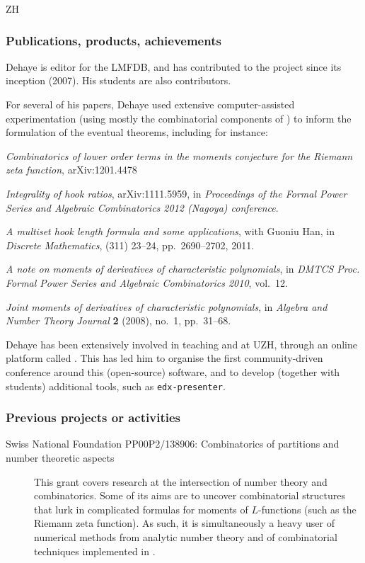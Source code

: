 \begin{sitedescription}{ZH}
\subsubsection*{Publications, products, achievements}
\begin{compactenum}
\item Dehaye is editor for the LMFDB, and has contributed to the project since its inception (2007). His students are also contributors. 
\item For several of his papers, Dehaye used extensive computer-assisted experimentation (using mostly the combinatorial components of \Sage) to inform the formulation of the eventual theorems, including for instance:
\begin{compactitem}
\item \emph{Combinatorics of lower order terms in the moments conjecture for the Riemann zeta function}, \textsf{arXiv:1201.4478}
\item \emph{Integrality of hook ratios}, \textsf{arXiv:1111.5959}, in \emph{Proceedings of the Formal Power Series and Algebraic Combinatorics 2012 (Nagoya) conference}.
\item \emph{A multiset hook length formula and some applications}, with Guoniu Han, in \emph{Discrete Mathematics}, (311) 23--24, pp.~2690--2702, 2011.
\item \emph{A note on moments of derivatives of characteristic polynomials}, in \emph{DMTCS Proc. Formal Power Series and Algebraic Combinatorics 2010}, vol.~12.
\item \emph{Joint moments of derivatives of characteristic polynomials}, in \emph{Algebra and Number Theory Journal} {\bf 2} (2008), no.~1,  pp.~31--68.
\end{compactitem}
\item Dehaye has been extensively involved in teaching \Python and \Sage at UZH, through an online platform called \OpenEdX. This has led him to organise the first community-driven conference around this (open-source) software, and to develop (together with students) additional tools, such as \texttt{edx-presenter}. 
\end{compactenum}

\subsubsection*{Previous projects or activities}
\begin{description}
\item[Swiss National Foundation PP00P2/138906: Combinatorics of partitions and number theoretic aspects] This grant covers research at the intersection of number theory and combinatorics. Some of its aims are to uncover combinatorial structures that lurk in complicated formulas for moments of $L$-functions (such as the Riemann zeta function). As such, it is simultaneously a heavy user of numerical methods from analytic number theory and of combinatorial techniques implemented in \Sage.
\end{description}


\end{sitedescription}

